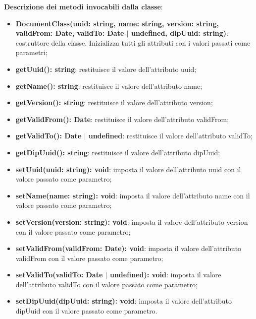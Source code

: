 \documentclass[a4paper,12pt]{article}
\begin{document}
{              \noindent \textbf{Descrizione dei metodi invocabili dalla classe}:
                \begin{itemize}
                    \item \textbf{DocumentClass(uuid: string, name: string, version: string, validFrom: Date, validTo: Date $|$ undefined, dipUuid: string)}: costruttore della classe. Inizializza tutti gli attributi con i valori passati come parametri;
                    \item \textbf{getUuid(): string}: restituisce il valore dell'attributo uuid;
                    \item \textbf{getName(): string}: restituisce il valore dell'attributo name;
                    \item \textbf{getVersion(): string}: restituisce il valore dell'attributo version;
                    \item \textbf{getValidFrom(): Date}: restituisce il valore dell'attributo validFrom;
                    \item \textbf{getValidTo(): Date $|$ undefined}: restituisce il valore dell'attributo validTo;
                    \item \textbf{getDipUuid(): string}: restituisce il valore dell'attributo dipUuid;
                    \item \textbf{setUuid(uuid: string): void}: imposta il valore dell'attributo uuid con il valore passato come parametro;
                    \item \textbf{setName(name: string): void}: imposta il valore dell'attributo name con il valore passato come parametro;
                    \item \textbf{setVersion(version: string): void}: imposta il valore dell'attributo version con il valore passato come parametro;
                    \item \textbf{setValidFrom(validFrom: Date): void}: imposta il valore dell'attributo validFrom con il valore passato come parametro;
                    \item \textbf{setValidTo(validTo: Date $|$ undefined): void}: imposta il valore dell'attributo validTo con il valore passato come parametro;
                    \item \textbf{setDipUuid(dipUuid: string): void}: imposta il valore dell'attributo dipUuid con il valore passato come parametro.
                \end{itemize}


}
\end{document}
